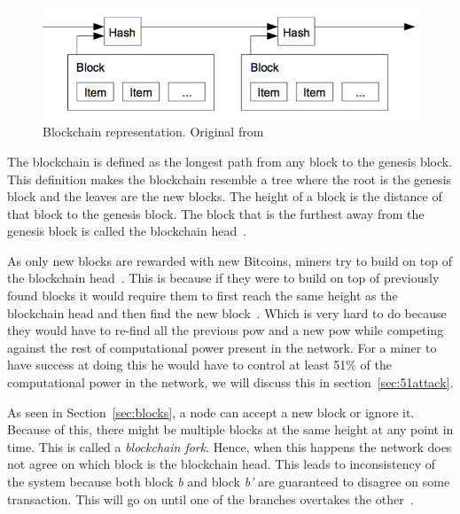 \begin{figure}[h]
\centering
\includegraphics[scale=0.65]{figs/orderBlocks}
\caption{Blockchain representation. Original from~\protect\cite{nakamoto2008bitcoin}}
\label{fig:blocks}
\end{figure}

The blockchain is defined as the longest path from any block to the genesis block. This definition makes the blockchain resemble a tree where the root is the genesis block and the leaves are the new blocks. The height of a block is the distance of that block to the genesis block. The block that is the furthest away from the genesis block is called the blockchain head~\cite{decker2013information}.

As only new blocks are rewarded with new Bitcoins, miners try to build on top of the blockchain head~\cite{decker2013information}. This is because if they were to build on top of previously found blocks it would require them to first reach the same height as the blockchain head and then find the new block~\cite{nakamoto2008bitcoin}. Which is very hard to do because they would have to re-find all the previous \acrshort{pow} and a new \acrshort{pow} while competing against the rest of computational power present in the network. For a miner to have success at doing this he would have to control at least 51\% of the computational power in the network, we will discuss this in section~\ref{sec:51attack}.

As seen in Section~\ref{sec:blocks}, a node can accept a new block or ignore it. Because of this, there might be multiple blocks at the same height at any point in time. This is called a \textit{blockchain fork}. Hence, when this happens the network does not agree on which block is the blockchain head. This leads to inconsistency of the system because both block \textit{b} and block \textit{b'} are guaranteed to disagree on some transaction. This will go on until one of the branches overtakes the other~\cite{decker2013information}.

